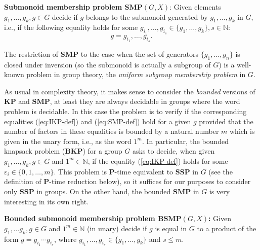 \documentclass[10pt]{amsart}
\theoremstyle{definition}
\def\P{{\mathbf{P}}}
\def\SSP{{\mathbf{SSP}}}
\def\SMP{{\mathbf{SMP}}}
\def\BSMP{{\mathbf{BSMP}}}
\def\BKP{{\mathbf{BKP}}}
\def\KP{{\mathbf{KP}}}
\begin{document}
\medskip
\noindent
{\bf Submonoid membership problem $\mathbf{SMP}(G,X)$\index{$\SMP(G,X)$}}:  Given elements $g_1,\ldots,g_k,g\in G$
decide if $g$ belongs to the submonoid generated by $g_1, \ldots, g_k$ in $G$, i.e., if the following equality holds for some $g_{i_1}, \ldots, g_{i_s} \in \{g_1, \ldots, g_k\}, s \in \mathbb{N}$:
\begin{equation}\label{eq:SMP-def}
g = g_{i_1}, \ldots, g_{i_s}.
\end{equation}

\medskip
The restriction of $\SMP$ to the case when the set of generators $\{g_1, \ldots,g_n\}$ is closed under inversion (so the submonoid is actually a subgroup of $G$) is  a well-known problem in group theory, the {\em uniform subgroup membership problem} in $G$.

As usual in complexity theory, it makes sense to consider the {\em bounded} versions of $\KP$ and $\SMP$, at least they are always decidable in groups where the word problem is decidable. In this case the problem is to verify  if the corresponding equalities (\ref{eq:IKP-def}) and  (\ref{eq:SMP-def}) hold for a given $g$ provided that the number of factors in these equalities  is bounded by a natural number $m$ which is given in the unary form, i.e., as the word $1^m$. In particular, the bounded knapsack problem ($\BKP$) for a group $G$ asks to decide, when  given $g_1,\ldots,g_k,g\in G$ and $1^m\in\mathbb N$, if the equality (\ref{eq:IKP-def}) holds for some
$\varepsilon_i \in \{0,1, \ldots, m \}$.
This problem  is  $\P$-time equivalent to  $\SSP$ in $G$ (see the definition of $\P$-time reduction below), so it suffices for our purposes to consider only $\SSP$ in groups.
On the other hand,  the bounded $\SMP$ in $G$ is very interesting in its own right.


\medskip \noindent
{\bf Bounded submonoid membership problem $\BSMP(G,X)$\index{$\BSMP(G,X)$}:}
Given $g_1, \ldots g_k, g \in G$ and $1^m \in \mathbb{N}$ (in unary)
decide if $g$ is equal in $G$ to a product of the form
$g=g_{i_1}\cdots g_{i_s}$, where $g_{i_1}, \ldots, g_{i_s} \in \{g_1, \ldots, g_k\}$ and  $s\le m$.


\end{document}
